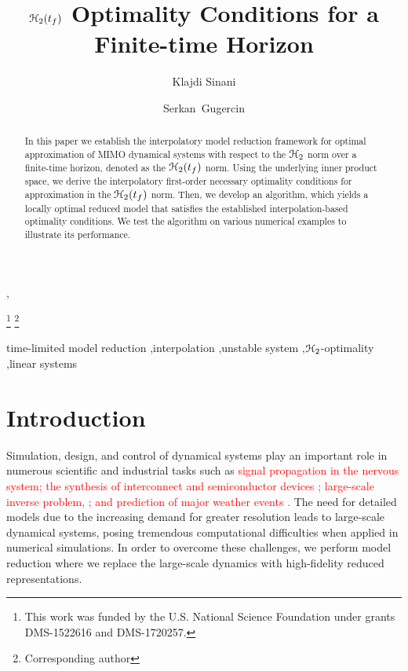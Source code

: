 \documentclass[twocolumn]{autart}
\begin{document}
\begin{frontmatter}
\title{ {$\EuScript{H}_2(t_f)$ Optimality Conditions for a Finite-time Horizon} }
\author{Klajdi Sinani} ,
\author{Serkan~Gugercin} 

\thanks[mytitlenote]{This work was funded by the U.S. National Science Foundation under grants DMS-1522616 and  DMS-1720257.}
\thanks[cor]{Corresponding author }
\address{Department of Mathematics, Virginia Polytechnic Institute and State University, Blacksburg, VA 24061, USA}

\begin{abstract} 
In this paper we establish the interpolatory model reduction framework for optimal approximation of MIMO dynamical systems with respect to the $\EuScript{H}_2$ norm over a finite-time horizon, denoted as the $\EuScript{H}_2(t_f)$ norm.
Using the underlying inner product space, we derive the interpolatory first-order necessary optimality conditions for approximation in the $\EuScript{H}_2(t_f)$ norm. Then,  we  develop an algorithm, which yields a locally optimal reduced model that satisfies the established interpolation-based optimality conditions. We test the algorithm on various numerical examples to illustrate its performance.
\end{abstract}

\begin{keyword}
 time-limited model reduction \sep interpolation \sep unstable system \sep $\EuScript{H}_2$-optimality \sep linear systems 
\end{keyword}

\end{frontmatter}
\section{Introduction}
Simulation, design, and control of dynamical systems play an important role in numerous scientific and industrial tasks such as \textcolor{red}{signal propagation in the nervous system\cite{kellems2009low};  the synthesis  of
interconnect \cite{BonD07} and semiconductor devices \cite{Hess2014}; large-scale inverse problem,
 \cite{Druskin2011solution,Lieberman2010,de2015nonlinear}; and prediction of major weather events \cite{Ant05}.}
The need for  detailed  models due to the increasing demand for greater resolution leads to  
large-scale dynamical systems, posing tremendous computational difficulties when applied in numerical simulations. In order to overcome these challenges, we perform  model reduction where we replace the large-scale dynamics with high-fidelity reduced representations.
\end{document}

